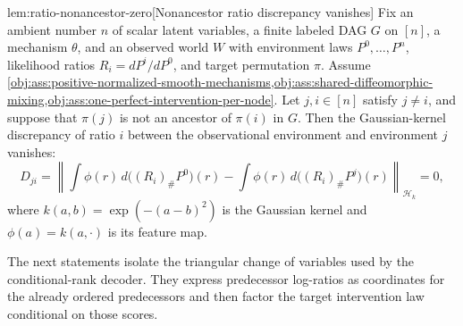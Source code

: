 \begin{lemmav}{lem:ratio-nonancestor-zero}[Nonancestor ratio discrepancy vanishes]
Fix an ambient number \(n\) of scalar latent variables, a finite labeled DAG \(G\) on \([n]\), a mechanism \(\theta\), and an observed world \(W\) with environment laws \(P^0,\ldots,P^n\), likelihood ratios \(R_i=dP^i/dP^0\), and target permutation \(\pi\).  Assume \cref{obj:ass:positive-normalized-smooth-mechanisms,obj:ass:shared-diffeomorphic-mixing,obj:ass:one-perfect-intervention-per-node}.  Let \(j,i\in[n]\) satisfy \(j\ne i\), and suppose that \(\pi(j)\) is not an ancestor of \(\pi(i)\) in \(G\).  Then the Gaussian-kernel discrepancy of ratio \(i\) between the observational environment and environment \(j\) vanishes:
\[
D_{ji}
=
\left\|
\int \phi(r)\,d\bigl((R_i)_{\#}P^0\bigr)(r)
-
\int \phi(r)\,d\bigl((R_i)_{\#}P^j\bigr)(r)
\right\|_{\mathcal H_k}
=0,
\]
where \(k(a,b)=\exp(-(a-b)^2)\) is the Gaussian kernel and \(\phi(a)=k(a,\cdot)\) is its feature map.
\end{lemmav}

The next statements isolate the triangular change of variables used by the conditional-rank decoder. They express predecessor log-ratios as coordinates for the already ordered predecessors and then factor the target intervention law conditional on those scores.

